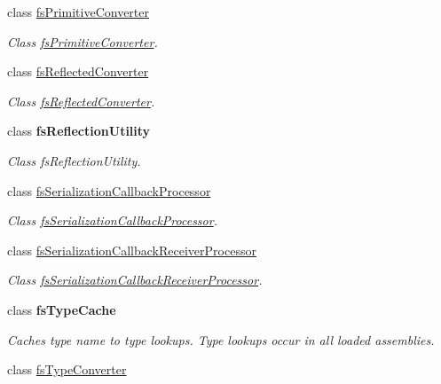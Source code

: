 \begin{DoxyCompactItemize}
class \hyperlink{class_full_serializer_1_1_internal_1_1fs_primitive_converter}{fs\+Primitive\+Converter}
\begin{DoxyCompactList}\small\item\em Class \hyperlink{class_full_serializer_1_1_internal_1_1fs_primitive_converter}{fs\+Primitive\+Converter}. \end{DoxyCompactList}\item 
class \hyperlink{class_full_serializer_1_1_internal_1_1fs_reflected_converter}{fs\+Reflected\+Converter}
\begin{DoxyCompactList}\small\item\em Class \hyperlink{class_full_serializer_1_1_internal_1_1fs_reflected_converter}{fs\+Reflected\+Converter}. \end{DoxyCompactList}\item 
class {\bfseries fs\+Reflection\+Utility}
\begin{DoxyCompactList}\small\item\em Class fs\+Reflection\+Utility. \end{DoxyCompactList}\item 
class \hyperlink{class_full_serializer_1_1_internal_1_1fs_serialization_callback_processor}{fs\+Serialization\+Callback\+Processor}
\begin{DoxyCompactList}\small\item\em Class \hyperlink{class_full_serializer_1_1_internal_1_1fs_serialization_callback_processor}{fs\+Serialization\+Callback\+Processor}. \end{DoxyCompactList}\item 
class \hyperlink{class_full_serializer_1_1_internal_1_1fs_serialization_callback_receiver_processor}{fs\+Serialization\+Callback\+Receiver\+Processor}
\begin{DoxyCompactList}\small\item\em Class \hyperlink{class_full_serializer_1_1_internal_1_1fs_serialization_callback_receiver_processor}{fs\+Serialization\+Callback\+Receiver\+Processor}. \end{DoxyCompactList}\item 
class {\bfseries fs\+Type\+Cache}
\begin{DoxyCompactList}\small\item\em Caches type name to type lookups. Type lookups occur in all loaded assemblies. \end{DoxyCompactList}\item 
class \hyperlink{class_full_serializer_1_1_internal_1_1fs_type_converter}{fs\+Type\+Converter}

\end{DoxyCompactItemize}
